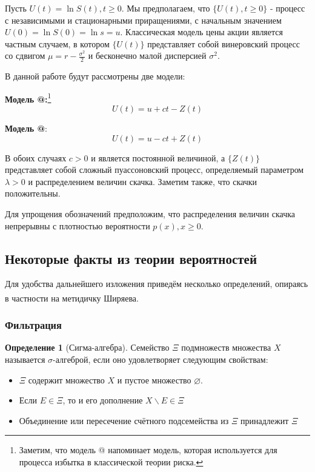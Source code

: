 \documentclass[a4paper,12pt]{article}
\makeatletter
\theoremstyle{definition}
\newtheorem{definition}{Определение}[section]
\newcommand*{\rom}[1]{\expandafter\@slowromancap\romannumeral #1@}
\makeatother
\begin{document}
Пусть $U(t) = \ln{S(t)}, t \ge 0$. Мы предполагаем, что $\{U(t), t \ge 0\}$ - процесс с независимыми и стационарными приращениями, с начальным значением $U(0) = \ln{S(0)} = \ln{s} = u$. Классическая модель цены акции является частным случаем, в котором $\{U(t)\}$ представляет собой винеровский процесс со сдвигом $\mu = r - \frac{\sigma ^ {2}}{2}$ и бесконечно малой дисперсией $\sigma ^ {2}$. 

В данной работе будут рассмотрены две модели:

\textbf{Модель \rom{1}:}\footnote{Заметим, что модель \rom{1} напоминает модель, которая используется для процесса избытка в классической теории риска.}
\begin{equation}\label{eq:model1_definition}
    U(t) = u + ct - Z(t)
\end{equation}

\textbf{Модель \rom{2}}: 
\begin{equation}\label{eq:model2_definition}
    U(t) = u - ct + Z(t)
\end{equation}

В обоих случаях $c > 0$ и является постоянной величиной, а $\{Z(t)\}$ представляет собой сложный пуассоновский процесс, определяемый параметром $\lambda > 0$ и распределением величин скачка. Заметим также, что скачки положительны.

\label{sec:positivityOfJumsAssumption} Для упрощения обозначений предположим, что распределения величин скачка
непрерывны с плотностью вероятности $p(x), x \ge 0$. 

\subsection{Некоторые факты из теории вероятностей}

Для удобства дальнейшего изложения приведём несколько определений, опираясь в частности на метидичку Ширяева\textsuperscript{\cite{bib:Shiryaev_Bulynski}}.

\subsubsection{Фильтрация}

\begin{definition}[Сигма-алгебра]
    \label{def:sigma_algebra}
    Семейство $\Xi$ подмножеств множества $X$ называется $\sigma$-алгеброй, если оно удовлетворяет следующим свойствам:
    
    \begin{itemize}
        \item $\Xi$ содержит множество $X$ и пустое множество $\varnothing$.
        \item Если $E \in \Xi$, то и его дополнение $X \backslash E \in \Xi$
        \item Объединение или пересечение счётного подсемейства из $\Xi$ принадлежит $\Xi$
    \end{itemize}

\end{definition}
\end{document}
